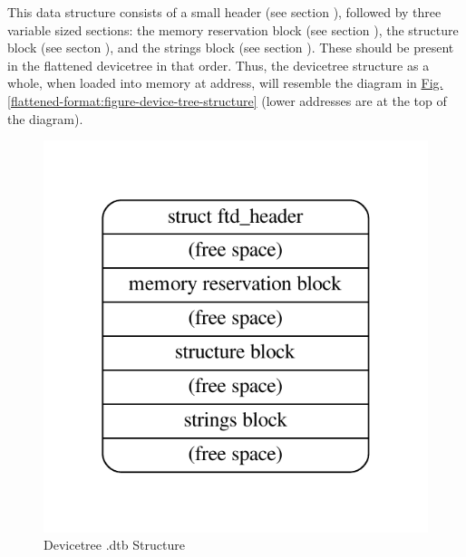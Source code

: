\documentclass[a4paper,10pt,oneside]{sphinxmanual}
\begin{document}
This data structure consists of a small header
(see section {\hyperref[flattened\string-format:sect\string-fdt\string-header]{}}),
followed by three variable sized sections:
the memory reservation block (see section {\hyperref[flattened\string-format:sect\string-fdt\string-memory\string-reservation\string-block]{}}),
the structure block (see secton {\hyperref[flattened\string-format:sect\string-fdt\string-structure\string-block]{}}),
and the strings block (see section {\hyperref[flattened\string-format:sect\string-fdt\string-strings\string-block]{}}).
These should be present in the flattened devicetree in that order.
Thus, the devicetree structure as a whole, when loaded into memory at address,
will resemble the diagram in \hyperref[flattened-format:figure-device-tree-structure]{Fig. \ref{flattened-format:figure-device-tree-structure}}
(lower addresses are at the top of the diagram).
\begin{figure}[htbp]
\centering
\capstart

\includegraphics{graphviz-23a197b43ca822bb92fb1a341bdd04b0845caa29.pdf}
\caption{Devicetree .dtb Structure}\label{flattened-format:figure-device-tree-structure}\label{flattened-format:id1}\end{figure}
\end{document}
